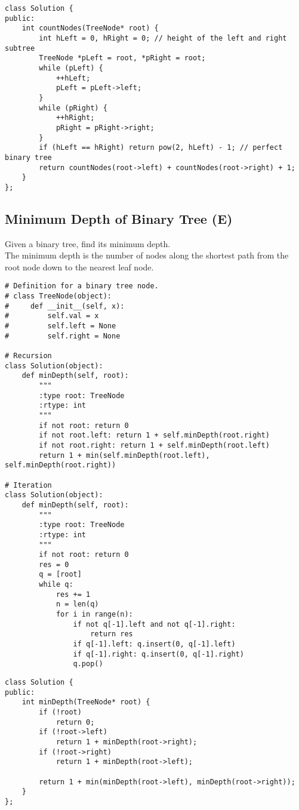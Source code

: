 \begin{lstlisting}
class Solution {
public:
    int countNodes(TreeNode* root) {
        int hLeft = 0, hRight = 0; // height of the left and right subtree
        TreeNode *pLeft = root, *pRight = root;
        while (pLeft) {
            ++hLeft;
            pLeft = pLeft->left;
        }
        while (pRight) {
            ++hRight;
            pRight = pRight->right;
        }
        if (hLeft == hRight) return pow(2, hLeft) - 1; // perfect binary tree
        return countNodes(root->left) + countNodes(root->right) + 1;
    }
};
\end{lstlisting}

\subsection{Minimum Depth of Binary Tree (E)}
Given a binary tree, find its minimum depth.\\

The minimum depth is the number of nodes along the shortest path from the root node down to the nearest leaf node.\\

\begin{lstlisting}
# Definition for a binary tree node.
# class TreeNode(object):
#     def __init__(self, x):
#         self.val = x
#         self.left = None
#         self.right = None

# Recursion
class Solution(object):
    def minDepth(self, root):
        """
        :type root: TreeNode
        :rtype: int
        """
        if not root: return 0
        if not root.left: return 1 + self.minDepth(root.right)
        if not root.right: return 1 + self.minDepth(root.left)
        return 1 + min(self.minDepth(root.left), self.minDepth(root.right))
    
# Iteration
class Solution(object):
    def minDepth(self, root):
        """
        :type root: TreeNode
        :rtype: int
        """
        if not root: return 0
        res = 0
        q = [root]
        while q:
            res += 1
            n = len(q)
            for i in range(n):
                if not q[-1].left and not q[-1].right:
                    return res
                if q[-1].left: q.insert(0, q[-1].left)
                if q[-1].right: q.insert(0, q[-1].right)
                q.pop()
\end{lstlisting}

\begin{lstlisting}
class Solution {
public:
    int minDepth(TreeNode* root) {
        if (!root) 
            return 0;
        if (!root->left) 
            return 1 + minDepth(root->right);
        if (!root->right) 
            return 1 + minDepth(root->left);
            
        return 1 + min(minDepth(root->left), minDepth(root->right));
    }
};
\end{lstlisting}

